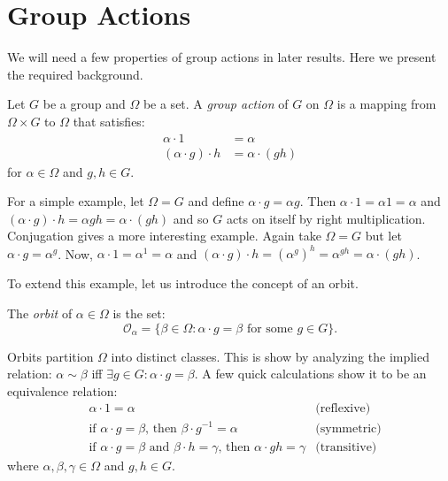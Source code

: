 \documentclass[main.tex]{subfiles}
\begin{document}
\section{Group Actions}

We will need a few properties of group actions in later results. Here we present the required background.

\hss

\begin{definition}
Let $G$ be a group and $\Omega$ be a set. A \emph{group action} of $G$ on $\Omega$ is a mapping from $\Omega \times G$ to $\Omega$ that satisfies:
\begin{align*}
\alpha \cdot 1 &= \alpha \\
(\alpha \cdot g) \cdot h &= \alpha \cdot (gh)
\end{align*}
for $\alpha \in \Omega$ and $g, h \in G$.
\end{definition}

\hss

For a simple example, let $\Omega = G$ and define $\alpha \cdot g = \alpha g$. Then $\alpha \cdot 1 = \alpha 1 = \alpha$ and $(\alpha \cdot g) \cdot h = \alpha g h = \alpha \cdot (gh)$ and so $G$ acts on itself by right multiplication. Conjugation gives a more interesting example. Again take $\Omega = G$ but let $\alpha \cdot g = \alpha^g$. Now, $\alpha \cdot 1 = \alpha^1 = \alpha$ and $(\alpha \cdot g) \cdot h = (\alpha^g)^h = \alpha^{gh} = \alpha \cdot (gh)$.

To extend this example, let us introduce the concept of an orbit.

\hss

\begin{definition}
The \emph{orbit} of $\alpha \in \Omega$ is the set:
$$\mathcal{O}_\alpha = \{ \beta \in \Omega : \alpha \cdot g = \beta \text{ for some } g \in G \}\text{.}$$
\end{definition}

\hss

Orbits partition $\Omega$ into distinct classes. This is show by analyzing the implied relation: $\alpha \sim \beta$ iff $\exists g \in G : \alpha \cdot g = \beta$. A few quick calculations show it to be an equivalence relation:
\begin{align*}
&\alpha \cdot 1 = \alpha &\text{(reflexive)} \\
&\text{if } \alpha \cdot g = \beta \text{, then } \beta \cdot g^{-1} = \alpha &\text{(symmetric)} \\
&\text{if } \alpha \cdot g = \beta \text{ and } \beta \cdot h = \gamma \text{, then } \alpha \cdot gh = \gamma  &\text{(transitive)}
\end{align*}
where $\alpha, \beta, \gamma \in \Omega$ and $g, h \in G$.
\end{document}
